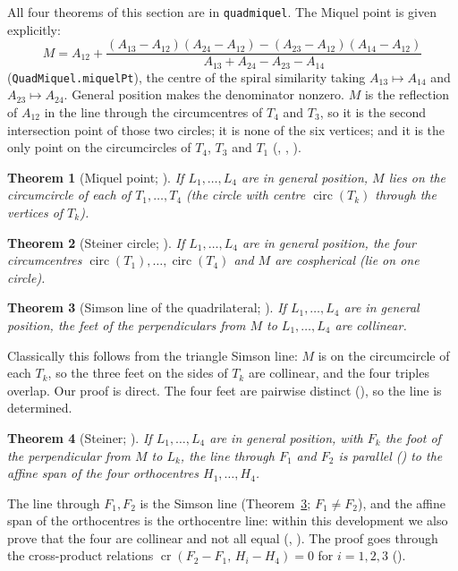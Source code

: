 \documentclass[11pt]{article}
\newtheorem{theorem}{Theorem}
\theoremstyle{definition}
\theoremstyle{remark}
\newcommand{\lean}[1]{\texttt{#1}}
\begin{document}
All four theorems of this section are in \lean{quadmiquel}. The Miquel point is given explicitly:
\[
  M=A_{12}+\frac{(A_{13}-A_{12})(A_{24}-A_{12})-(A_{23}-A_{12})(A_{14}-A_{12})}{A_{13}+A_{24}-A_{23}-A_{14}}
\]
(\lean{QuadMiquel.miquelPt}), the centre of the spiral similarity taking $A_{13}\mapsto A_{14}$ and
$A_{23}\mapsto A_{24}$. General position makes the denominator nonzero. $M$ is the reflection of $A_{12}$ in the line
through the circumcentres of $T_4$ and $T_3$, so it is the second intersection point of those two
circles; it is none of the six vertices; and it is the only point on the circumcircles of $T_4$,
$T_3$ and $T_1$ (, ,
).

\begin{theorem}[Miquel point; ]\label{thm:miquel}
If $L_1,\dots,L_4$ are in general position, $M$ lies on the circumcircle of each of $T_1,\dots,T_4$
(the circle with centre $\operatorname{circ}(T_k)$ through the vertices of $T_k$).
\end{theorem}

\begin{theorem}[Steiner circle; ]\label{thm:steiner}
If $L_1,\dots,L_4$ are in general position, the four circumcentres $\operatorname{circ}(T_1),\dots,
\operatorname{circ}(T_4)$ and $M$ are cospherical (lie on one circle).
\end{theorem}

\begin{theorem}[Simson line of the quadrilateral; ]\label{thm:simson}
If $L_1,\dots,L_4$ are in general position, the feet of the perpendiculars from $M$ to
$L_1,\dots,L_4$ are collinear.
\end{theorem}
Classically this follows from the triangle Simson line: $M$ is on the circumcircle of each $T_k$, so
the three feet on the sides of $T_k$ are collinear, and the four triples overlap. Our proof is direct. The four feet are pairwise distinct (), so the
line is determined.

\begin{theorem}[Steiner; ]\label{thm:par}
If $L_1,\dots,L_4$ are in general position, with $F_k$ the foot of the perpendicular from $M$ to $L_k$,
the line through $F_1$ and $F_2$ is parallel () to the affine span of
the four orthocentres $H_1,\dots,H_4$.
\end{theorem}
The line through $F_1,F_2$ is the Simson line (Theorem~\ref{thm:simson}; $F_1\ne F_2$), and the affine
span of the orthocentres is the orthocentre line: within this development we also prove that the four
are collinear and not all equal (,
). The proof goes through the cross-product relations
$\operatorname{cr}(F_2-F_1,\,H_i-H_4)=0$ for $i=1,2,3$ ().
\end{document}
